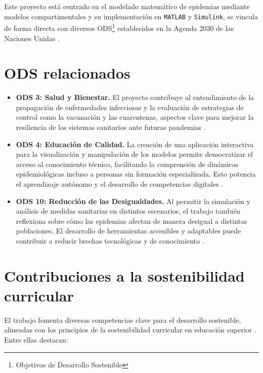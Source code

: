 
Este proyecto está centrado en el modelado matemático de epidemias mediante modelos compartimentales y su implementación en \texttt{MATLAB} y \texttt{Simulink}, se vincula de forma directa con diversos ODS\footnote{Objetivos de Desarrollo Sostenible} establecidos en la Agenda 2030 de las Naciones Unidas \cite{onu2015agenda2030}.

\section*{ODS relacionados}

\begin{itemize}
    \item \textbf{ODS 3: Salud y Bienestar.} El proyecto contribuye al entendimiento de la propagación de enfermedades infecciosas y la evaluación de estrategias de control como la vacunación y las cuarentenas, aspectos clave para mejorar la resiliencia de los sistemas sanitarios ante futuras pandemias \cite{who2020disorder}.
    
    \item \textbf{ODS 4: Educación de Calidad.} La creación de una aplicación interactiva para la visualización y manipulación de los modelos permite democratizar el acceso al conocimiento técnico, facilitando la comprensión de dinámicas epidemiológicas incluso a personas sin formación especializada. Esto potencia el aprendizaje autónomo y el desarrollo de competencias digitales \cite{unesco2020education}.
    
    \item \textbf{ODS 10: Reducción de las Desigualdades.} Al permitir la simulación y análisis de medidas sanitarias en distintos escenarios, el trabajo también reflexiona sobre cómo las epidemias afectan de manera desigual a distintas poblaciones. El desarrollo de herramientas accesibles y adaptables puede contribuir a reducir brechas tecnológicas y de conocimiento \cite{who2021inequality}.
\end{itemize}

\section*{Contribuciones a la sostenibilidad curricular}

El trabajo fomenta diversas competencias clave para el desarrollo sostenible, alineadas con los principios de la sostenibilidad curricular en educación superior \cite{lozano2017teaching}. Entre ellas destacan:

